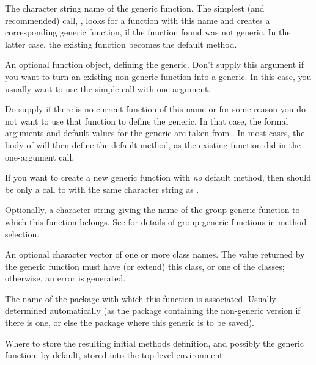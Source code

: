 \begin{Arguments}
\begin{ldescription}
\item[\code{name}]  The character string name of the generic function.
The simplest (and recommended) call, ,
looks for a function with this name and creates a corresponding
generic function,  if the function found was not generic.  In the
latter case, the existing function becomes the default method.

\item[\code{def}] An optional function object, defining the generic.
Don't supply this argument if you want to turn an existing non-generic
function into a generic. In this case, you usually want to use the
simple call with one argument.

Do supply  if there is no
current function of this name or for some reason you do not want
to use that function to define the generic. In that case, the
formal arguments and 
default values for the generic are taken from .  In most
cases, the body of  will then define the default method,
as the existing function did in the one-argument call.

If you want to create a new generic function with \emph{no}
default method, then  should be only a call to
 with the same character string as
.



\item[\code{group}]  Optionally, a character string giving the name of the group
generic function to which this function belongs.    See
 for details of group generic functions in method selection.

\item[\code{valueClass}]  An optional character vector of one or more class
names.  The value returned by the generic function must
have (or extend) this class, or one of the classes; otherwise,
an error is generated.

\item[\code{package}]  The name of the package with which this function is
associated.  Usually determined automatically (as the package
containing the non-generic version if there is one, or else the
package where this generic is to be saved).

\item[\code{where}]  Where to store the resulting initial methods definition,
and possibly the generic function; by
default, stored into the top-level environment.


\end{ldescription}
\end{Arguments}
